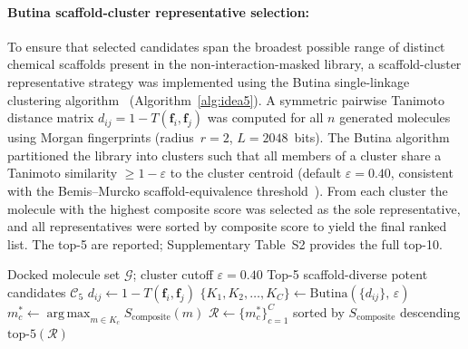 \documentclass[a4paper,12pt]{article}
\begin{document}
\paragraph{Butina scaffold-cluster representative
selection:}
To ensure that selected candidates span the broadest possible
range of distinct chemical scaffolds present in the
non-interaction-masked library, a scaffold-cluster
representative strategy was implemented using the Butina
single-linkage clustering algorithm~\cite{butina1999}
(Algorithm~\ref{alg:idea5}).
A symmetric pairwise Tanimoto distance matrix
$d_{ij} = 1 - T(\mathbf{f}_i, \mathbf{f}_j)$ was computed
for all $n$ generated molecules using Morgan fingerprints
(radius~$r = 2$, $L = 2048$~bits).
The Butina algorithm partitioned the library into clusters
such that all members of a cluster share a Tanimoto similarity
$\geq 1 - \varepsilon$ to the cluster centroid
(default $\varepsilon = 0.40$, consistent with the Bemis--Murcko
scaffold-equivalence threshold~\cite{bemis1996scaffolds}).
From each cluster the molecule with the highest composite score
was selected as the sole representative, and all representatives
were sorted by composite score to yield the final ranked list.
The top-5 are reported; Supplementary Table~S2 provides the
full top-10.
 
\begin{algorithm}[htbp]
\caption{Butina Scaffold-Cluster Representative
         Selection}
\label{alg:idea5}
\begin{algorithmic}[1]
\Require Docked molecule set $\mathcal{G}$; cluster cutoff
         $\varepsilon = 0.40$
\Ensure  Top-5 scaffold-diverse potent candidates $\mathcal{C}_5$
    \State $d_{ij} \gets 1 - T(\mathbf{f}_i, \mathbf{f}_j)$
\EndFor
\State $\{K_1, K_2, \ldots, K_C\} \gets
       \text{Butina}(\{d_{ij}\},\, \varepsilon)$
    \State $m_c^{*} \gets
           \operatorname{arg\,max}_{m \in K_c}
           S_{\text{composite}}(m)$
\EndFor
\State $\mathcal{R} \gets
       \{m_c^{*}\}_{c=1}^{C}$
       sorted by $S_{\text{composite}}$ descending
\State \Return $\text{top-5}(\mathcal{R})$
\end{algorithmic}
\end{algorithm}
 
\end{document}

